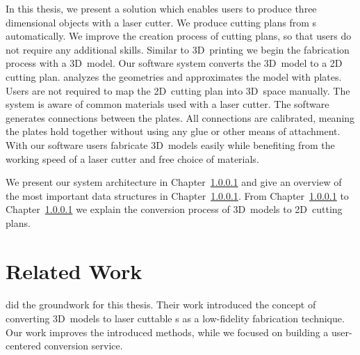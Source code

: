 \documentclass[../ClassicThesis.tex]{subfiles}
\begin{document}

In this thesis, we present a solution which enables users to
produce three dimensional objects with a laser cutter. We
produce cutting plans from {\threedmodel}s automatically.
We improve the creation process of cutting plans, so that users
do not require any additional skills. Similar to 3D~printing
we begin the fabrication process with a 3D~model.
Our software system {\platener} converts the 3D~model to a
2D cutting plan. {\platener} analyzes the geometries and
approximates the model with plates. Users are not required
to map the 2D~cutting plan into 3D~space manually. The
system is aware of common materials used with a laser
cutter. The software generates connections between the
plates. All connections are calibrated, meaning the plates
hold together without using any glue or other means of
attachment. With our software users fabricate 3D~models
easily while benefiting from the working speed of a laser
cutter and free choice of materials.




We present our system architecture in Chapter~\ref{} and give an
overview of the most important data structures in Chapter~\ref{}. From
Chapter~\ref{} to Chapter~\ref{} we explain the conversion process of
3D~models to 2D~cutting plans.

\section{Related Work}
\label{sec:related-work}

\paragraph{{\platener}} \citeauthor{master-thesis} did the groundwork
for this thesis. Their work introduced the concept of converting
3D~models to laser cuttable {\svgfile}s as a low-fidelity fabrication
technique. Our work improves the introduced methods, while we focused
on building a user-centered conversion service.
\end{document}
